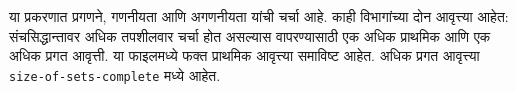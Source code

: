 \documentclass[../../../include/open-logic-chapter]{subfiles}
\begin{document}

\begin{editorial}
या प्रकरणात प्रगणने, गणनीयता आणि अगणनीयता यांची चर्चा आहे.
काही विभागांच्या दोन आवृत्त्या आहेत: संचसिद्धान्तावर अधिक
तपशीलवार चर्चा होत असल्यास वापरण्यासाठी एक अधिक प्राथमिक
आणि एक अधिक प्रगत आवृत्ती. या फाइलमध्ये फक्त प्राथमिक
आवृत्त्या समाविष्ट आहेत. अधिक प्रगत आवृत्त्या
\verb|size-of-sets-complete| मध्ये आहेत.
\end{editorial}











\OLEndChapterHook
\end{document}
